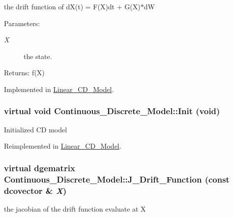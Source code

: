 the drift function of dX(t) = F(X)dt + G(X)$\ast$dW 

\begin{Desc}
\item[Parameters:]
\begin{description}
\item[{\em X}]the state.\end{description}
\end{Desc}
\begin{Desc}
\item[Returns:]f(X) \end{Desc}


Implemented in \hyperlink{class_linear___c_d___model_4a35ab32a6ff01885368d1b3690f4925}{Linear\_\-CD\_\-Model}.\hypertarget{class_continuous___discrete___model_fb787d768352c5a38048c35e51e7735d}{
\subsubsection[{Init}]{\setlength{\rightskip}{0pt plus 5cm}virtual void Continuous\_\-Discrete\_\-Model::Init (void)}}
\label{class_continuous___discrete___model_fb787d768352c5a38048c35e51e7735d}


Initialized CD model 

Reimplemented in \hyperlink{class_linear___c_d___model_c115137cf3ae0d1670880d5a8b0a8bd4}{Linear\_\-CD\_\-Model}.\hypertarget{class_continuous___discrete___model_634d515a19cc782505935c8f23b00fff}{
\subsubsection[{J\_\-Drift\_\-Function}]{\setlength{\rightskip}{0pt plus 5cm}virtual dgematrix Continuous\_\-Discrete\_\-Model::J\_\-Drift\_\-Function (const dcovector \& {\em X})}}
\label{class_continuous___discrete___model_634d515a19cc782505935c8f23b00fff}


the jacobian of the drift function evaluate at X 

